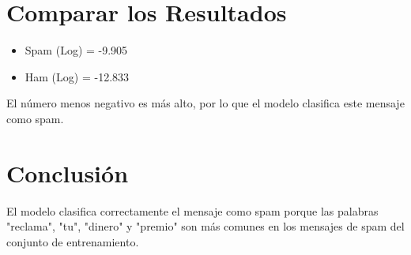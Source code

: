 \documentclass{article}
\begin{document}
\section{Comparar los Resultados}
\begin{itemize}
    \item Spam (Log) = -9.905
    \item Ham (Log) = -12.833
\end{itemize}
El número menos negativo es más alto, por lo que el modelo clasifica este mensaje como spam.

\section{Conclusión}
El modelo clasifica correctamente el mensaje como spam porque las palabras "reclama", "tu", "dinero" y "premio" son más comunes en los mensajes de spam del conjunto de entrenamiento.
\end{document}
